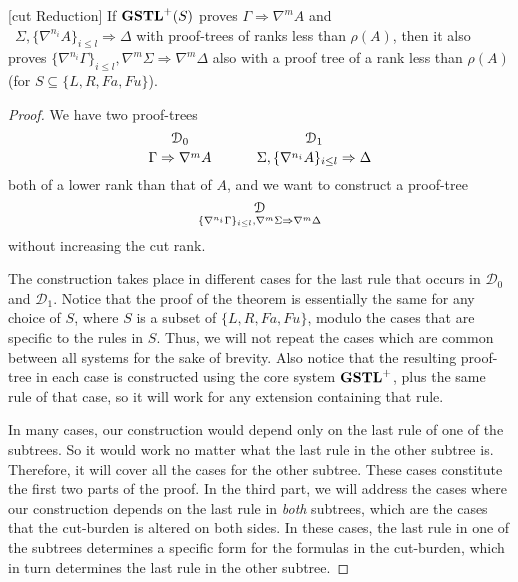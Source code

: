 \begin{thm}\label{thm:gstl-cut-reduction}[cut Reduction]
  If $\mathbf{GSTL}^+(S)$ proves $\Gamma \Rightarrow \nabla^m A$ and\\\ $\Sigma , \{\nabla^{n_i} A\}_{i \leq l} \Rightarrow \Delta$ with proof-trees of ranks less than $\rho(A)$, then it also proves $\{\nabla^{n_i} \Gamma\}_{i \leq l} , \nabla^m\Sigma \Rightarrow \nabla^m\Delta$ also with a proof tree of a rank less than $\rho(A)$ (for $S \subseteq \{L, R, Fa, Fu\}$).
  \end{thm}
  \begin{proof}
    We have two proof-trees
    \[
      {\mathcal{D}_0
      \atop
      \Gamma \Rightarrow \nabla^m A}
      \hspace{3em}
      {\mathcal{D}_1
      \atop
      \Sigma , \{\nabla^{n_i} A\}_{i \leq l} \Rightarrow \Delta}
    \]
    both of a lower rank than that of $A$, and we want to construct a proof-tree
    \[\mathcal{D} \atop \{\nabla^{n_i} \Gamma\}_{i \leq l} , \nabla^m \Sigma \Rightarrow \nabla^m \Delta \]
    without increasing the cut rank.
  
    The construction takes place in different cases for the last rule that occurs in $\mathcal{D}_0$ and $\mathcal{D}_1$. Notice that the proof of the theorem is essentially the same for any choice of $S$, where $S$ is a subset of $\{L, R, Fa, Fu\}$, modulo the cases that are specific to the rules in $S$. Thus, we will not repeat the cases which are common between all systems for the sake of brevity. Also notice that the resulting proof-tree in each case is constructed using the core system $\mathbf{GSTL}^+$, plus the same rule of that case, so it will work for any extension containing that rule.
  
    In many cases, our construction would depend only on the last rule of one of the subtrees. So it would work no matter what the last rule in the other subtree is. Therefore, it will cover all the cases for the other subtree. These cases constitute the first two parts of the proof. In the third part, we will address the cases where our construction depends on the last rule in \emph{both} subtrees, which are the cases that the cut-burden is altered on both sides. In these cases, the last rule in one of the subtrees determines a specific form for the formulas in the cut-burden, which in turn determines the last rule in the other subtree.
  

\end{proof}
